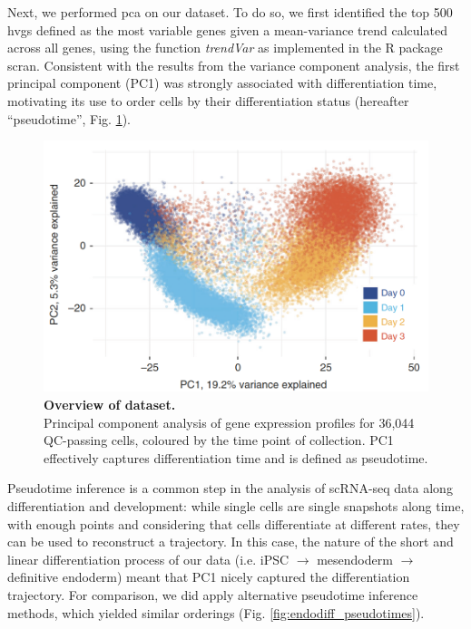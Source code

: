 Next, we performed \gls{pca} on our dataset.
To do so, we first identified the top 500 \gls{hvgs} defined as the most variable genes given a mean-variance trend calculated across all genes, using the function \textit{trendVar} as implemented in the R package scran.
Consistent with the results from the variance component analysis, the first principal component (PC1) was strongly associated with differentiation time, motivating its use to order cells by their differentiation status (hereafter “pseudotime”, Fig. \ref{fig:endodiff_pca}).\\

\begin{figure}[h]
\centering
\includegraphics[width=14cm]{Chapter4/Fig/endodiff_pca_overview.png}
\caption[Overview of dataset.]{\textbf{Overview of dataset.}\\
Principal component analysis of gene expression profiles for 36,044 QC-passing
cells, coloured by the time point of collection.
PC1 effectively captures differentiation time and is defined as pseudotime.}
\label{fig:endodiff_pca}
\end{figure}

Pseudotime inference is a common step in the analysis of scRNA-seq data along differentiation and development: while single cells are single snapshots along time, with enough points and considering that cells differentiate at different rates, they can be used to reconstruct a trajectory.
In this case, the nature of the short and linear differentiation process of our data (i.e. iPSC $\rightarrow$ mesendoderm $\rightarrow$ definitive endoderm) meant that PC1 nicely captured the differentiation trajectory.
For comparison, we did apply alternative pseudotime inference methods, which yielded similar orderings (Fig. \ref{fig:endodiff_pseudotimes}).

